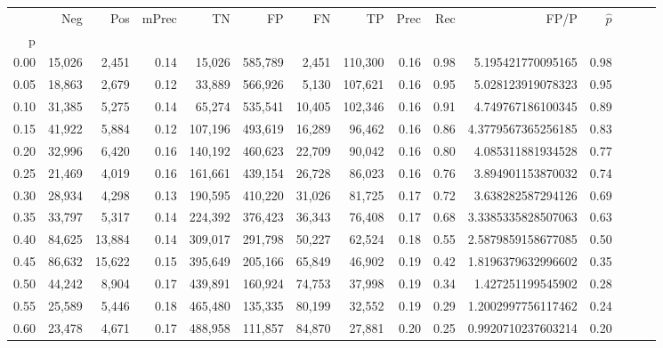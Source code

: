 \begin{tabular}{rrrrrrrrrrrrrrr}
\toprule
{} &     Neg &     Pos & mPrec &       TN &       FP &       FN &       TP &  Prec &   Rec &                 FP/P & $\hat{p}$ \\
p    &         &         &       &          &          &          &          &       &       &                      &           \\
\midrule
0.00 &  15,026 &   2,451 &  0.14 &   15,026 &  585,789 &    2,451 &  110,300 &  0.16 &  0.98 &    5.195421770095165 &      0.98 \\
0.05 &  18,863 &   2,679 &  0.12 &   33,889 &  566,926 &    5,130 &  107,621 &  0.16 &  0.95 &    5.028123919078323 &      0.95 \\
0.10 &  31,385 &   5,275 &  0.14 &   65,274 &  535,541 &   10,405 &  102,346 &  0.16 &  0.91 &    4.749767186100345 &      0.89 \\
0.15 &  41,922 &   5,884 &  0.12 &  107,196 &  493,619 &   16,289 &   96,462 &  0.16 &  0.86 &   4.3779567365256185 &      0.83 \\
0.20 &  32,996 &   6,420 &  0.16 &  140,192 &  460,623 &   22,709 &   90,042 &  0.16 &  0.80 &    4.085311881934528 &      0.77 \\
0.25 &  21,469 &   4,019 &  0.16 &  161,661 &  439,154 &   26,728 &   86,023 &  0.16 &  0.76 &    3.894901153870032 &      0.74 \\
0.30 &  28,934 &   4,298 &  0.13 &  190,595 &  410,220 &   31,026 &   81,725 &  0.17 &  0.72 &    3.638282587294126 &      0.69 \\
0.35 &  33,797 &   5,317 &  0.14 &  224,392 &  376,423 &   36,343 &   76,408 &  0.17 &  0.68 &   3.3385335828507063 &      0.63 \\
0.40 &  84,625 &  13,884 &  0.14 &  309,017 &  291,798 &   50,227 &   62,524 &  0.18 &  0.55 &   2.5879859158677085 &      0.50 \\
0.45 &  86,632 &  15,622 &  0.15 &  395,649 &  205,166 &   65,849 &   46,902 &  0.19 &  0.42 &   1.8196379632996602 &      0.35 \\
0.50 &  44,242 &   8,904 &  0.17 &  439,891 &  160,924 &   74,753 &   37,998 &  0.19 &  0.34 &    1.427251199545902 &      0.28 \\
0.55 &  25,589 &   5,446 &  0.18 &  465,480 &  135,335 &   80,199 &   32,552 &  0.19 &  0.29 &   1.2002997756117462 &      0.24 \\
0.60 &  23,478 &   4,671 &  0.17 &  488,958 &  111,857 &   84,870 &   27,881 &  0.20 &  0.25 &   0.9920710237603214 &      0.20 \\

\end{tabular}
